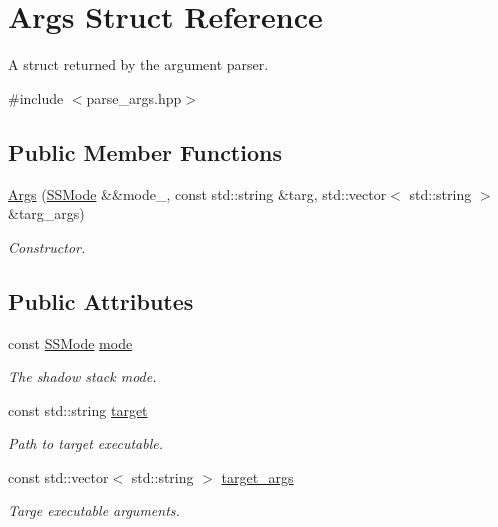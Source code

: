 \hypertarget{struct_args}{}\section{Args Struct Reference}
\label{struct_args}


A struct returned by the argument parser.  




{\ttfamily \#include $<$parse\+\_\+args.\+hpp$>$}

\subsection*{Public Member Functions}
\begin{DoxyCompactItemize}
\item 
\hyperlink{struct_args_a84627d98452f42aaed06fd75f1b659df}{Args} (\hyperlink{struct_s_s_mode}{S\+S\+Mode} \&\&mode\+\_\+, const std\+::string \&targ, std\+::vector$<$ std\+::string $>$ \&targ\+\_\+args)
\begin{DoxyCompactList}\small\item\em Constructor. \end{DoxyCompactList}\end{DoxyCompactItemize}
\subsection*{Public Attributes}
\begin{DoxyCompactItemize}
\item 
const \hyperlink{struct_s_s_mode}{S\+S\+Mode} \hyperlink{struct_args_ab0be2adf6b41e1aa9803a6f2ea6fc6b2}{mode}
\begin{DoxyCompactList}\small\item\em The shadow stack mode. \end{DoxyCompactList}\item 
const std\+::string \hyperlink{struct_args_a49f5255b7466ee4e1329aa32ca069da6}{target}
\begin{DoxyCompactList}\small\item\em Path to target executable. \end{DoxyCompactList}\item 
const std\+::vector$<$ std\+::string $>$ \hyperlink{struct_args_aa9f8e387df0b3691352daf352876176d}{target\+\_\+args}
\begin{DoxyCompactList}\small\item\em Targe executable arguments. \end{DoxyCompactList}\end{DoxyCompactItemize}


